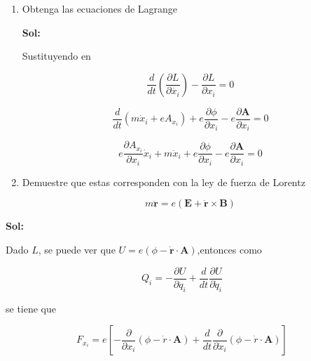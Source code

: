 \documentclass[12pt,a4paper]{article}
\begin{document}
\begin{enumerate}
    \begin{enumerate}
        \item Obtenga las ecuaciones de Lagrange
        
        \textbf{Sol:}
        
        Sustituyendo en
        
        \begin{equation*}
            \frac{d}{dt} \left(\frac{\partial  L}{\partial \dot{x_i}}\right) - \frac{\partial L}{\partial x_i} = 0
        \end{equation*}
        
        \begin{equation*}
            \frac{d}{dt} \left(m \dot{x}_i +e A_{x_i}\right) + e \frac{\partial \phi}{\partial x_i} - e \frac{\partial \mathbf{A}}{\partial x_i} = 0
        \end{equation*}
        
        \begin{equation*}
            e \frac{\partial A_{x_i}}{\partial x_i} \dot{x}_i + m \ddot{x}_i +   e \frac{\partial \phi}{\partial x_{i}} - e \frac{\partial \mathbf{A}}{\partial x_i} = 0
        \end{equation*}
        
       
        
        
        
        \item Demuestre que estas corresponden con la ley de fuerza de Lorentz
    
    
        
        \begin{equation*}
            m \ddot{\mathbf{r}} = e(\mathbf{E}+ \dot{\mathbf{r}} \times \mathbf{B})
        \end{equation*}
    \end{enumerate}
    
    \textbf{Sol:}
    
    Dado $L$, se puede ver que $U = e(\phi - \mathbf{\dot{r}} \cdot \mathbf{A})$,entonces como
    
    \begin{equation*}
        Q_i = - \frac{\partial U}{\partial q_i} + \frac{d}{dt} \frac{\partial U}{\partial \dot{q}_i}
    \end{equation*}
    
    se tiene que
    
    \begin{equation*}
        F_{x_i} = e\left[-\frac{\partial}{\partial x_i} \left(\phi - \dot{r} \cdot \mathbf{A}\right) + \frac{d}{dt} \frac{\partial}{\partial \dot{x}_i} \left(\phi - \dot{r} \cdot \mathbf{A}\right) \right]
    \end{equation*}
    

\end{enumerate}
\end{document}
